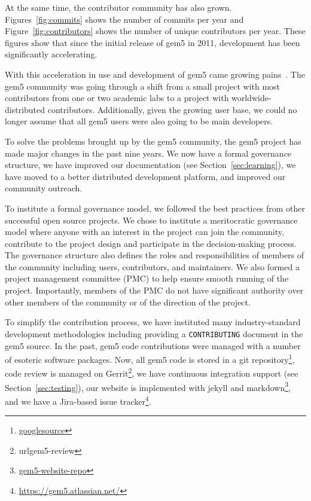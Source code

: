 At the same time, the contributor community has also grown.
Figures~\ref{fig:commits} shows the number of commits per year and Figure~\ref{fig:contributors} shows the number of unique contributors per year.
These figures show that since the initial release of gem5 in 2011, development has been significantly accelerating.

With this acceleration in use and development of gem5 came growing pains~\cite{Power-gem5horrors-2015}.
The gem5 community was going through a shift from a small project with most contributors from one or two academic labs to a project with worldwide-distributed contributors.
Additionally, given the growing user base, we could no longer assume that all gem5 users were also going to be main developers.

To solve the problems brought up by the gem5 community, the gem5 project has made major changes in the past nine years.
We now have a formal governance structure, we have improved our documentation (see Section~\ref{sec:learning}), we have moved to a better distributed development platform, and improved our community outreach.

To institute a formal governance model, we followed the best practices from other successful open source projects.
We chose to institute a meritocratic governance model where anyone with an interest in the project can join the community, contribute to the project design and participate in the decision-making process.
The governance structure also defines the roles and responsibilities of members of the community including users, contributors, and maintainers.
We also formed a project management committee (PMC) to help ensure smooth running of the project.
Importantly, members of the PMC do not have significant authority over other members of the community or of the direction of the project.

To simplify the contribution process, we have instituted many industry-standard development methodologies including providing a \verb|CONTRIBUTING| document in the gem5 source.
In the past, gem5 code contributions were managed with a number of esoteric software packages.
Now, all gem5 code is stored in a git repository\footnote{\url{googlesource}}, code review is managed on Gerrit\footnote{url{gem5-review}}, we have continuous integration support (see Section~\ref{sec:testing}), our website is implemented with jekyll and markdown\footnote{\url{gem5-website-repo}}, and we have a Jira-based issue tracker\footnote{\url{https://gem5.atlassian.net/}}.

